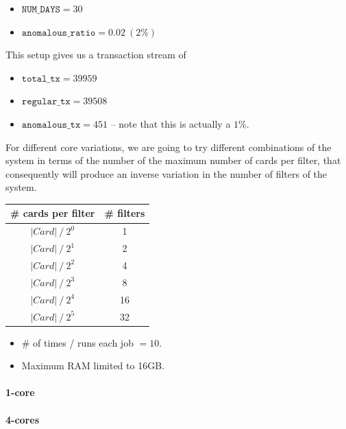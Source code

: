 \documentclass{article}
\begin{document}
\begin{itemize}
  \item $\texttt{NUM\_DAYS} = 30$
  \item $\texttt{anomalous\_ratio} = 0.02\ (2\%)$ 
\end{itemize}

This setup gives us a transaction stream of 
\begin{itemize}
  \item $\texttt{total\_tx} = 39959$
  \item $\texttt{regular\_tx} = 39508$
  \item $\texttt{anomalous\_tx} = 451$ -- note that this is actually a $1\%$.
\end{itemize}

For different core variations, we are going to try different combinations of the system in terms
of the number of the maximum number of cards per filter, that consequently will produce an inverse variation in the number of filters of the system.

\begin{table}[H]
  \renewcommand{\arraystretch}{1.5} %
  \centering
  \begin{tabular}{|c|c|}
  \hline
  \# cards per filter & \# filters \\ \hline
  $|Card|\ / \ {2^0} $  &   1     \\ \hline
  $|Card|\ / \ {2^1} $ &   2     \\ \hline
  $|Card|\ / \ {2^2} $ &   4     \\ \hline
  $|Card|\ / \ {2^3} $ &   8     \\ \hline
  $|Card|\ / \ {2^4} $ &   16    \\ \hline
  $|Card|\ / \ {2^5} $ &   32    \\ \hline
  \end{tabular}
\end{table}

\begin{itemize}
  \item \# of times / runs each job $=10$.
  \item Maximum RAM limited to 16GB.
\end{itemize}

\paragraph{1-core\\}

\paragraph{4-cores\\}
\end{document}
